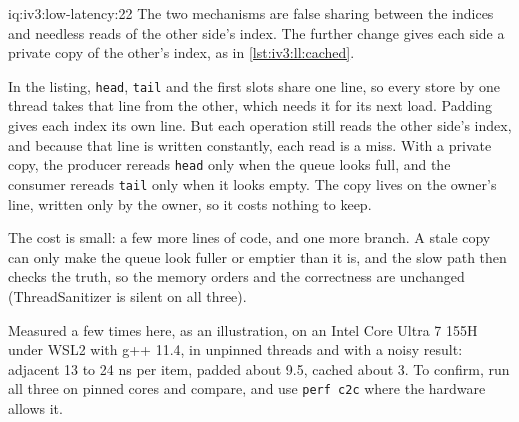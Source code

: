 \begin{solution}{iq:iv3:low-latency:22}
The two mechanisms are false sharing between the indices and needless reads of the other side's index. The further change gives each side a private copy of the other's index, as in \cref{lst:iv3:ll:cached}.
\label{lst:iv3:ll:cached}

In the listing, \texttt{head}, \texttt{tail} and the first slots share one line, so every store by one thread takes that line from the other, which needs it for its next load. Padding gives each index its own line. But each operation still reads the other side's index, and because that line is written constantly, each read is a miss. With a private copy, the producer rereads \texttt{head} only when the queue looks full, and the consumer rereads \texttt{tail} only when it looks empty. The copy lives on the owner's line, written only by the owner, so it costs nothing to keep.

The cost is small: a few more lines of code, and one more branch. A stale copy can only make the queue look fuller or emptier than it is, and the slow path then checks the truth, so the memory orders and the correctness are unchanged (ThreadSanitizer is silent on all three).

Measured a few times here, as an illustration, on an Intel Core Ultra 7 155H under WSL2 with g++ 11.4, in unpinned threads and with a noisy result: adjacent 13 to 24 ns per item, padded about 9.5, cached about 3. To confirm, run all three on pinned cores and compare, and use \texttt{perf c2c} where the hardware allows it.

\end{solution}

